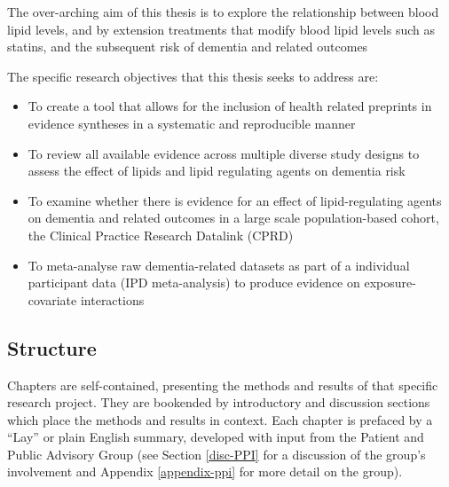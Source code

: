 \documentclass[a4paper, twoside]{templates/ociamthesis}
\providecommand{\tightlist}{%
  \setlength{\itemsep}{0pt}\setlength{\parskip}{0pt}}
\begin{document}
The over-arching aim of this thesis is to explore the relationship between blood lipid levels, and by extension treatments that modify blood lipid levels such as statins, and the subsequent risk of dementia and related outcomes

The specific research objectives that this thesis seeks to address are:

\begin{itemize}
\tightlist
\item
  To create a tool that allows for the inclusion of health related preprints in evidence syntheses in a systematic and reproducible manner
\item
  To review all available evidence across multiple diverse study designs to assess the effect of lipids and lipid regulating agents on dementia risk
\item
  To examine whether there is evidence for an effect of lipid-regulating agents on dementia and related outcomes in a large scale population-based cohort, the Clinical Practice Research Datalink (CPRD)
\item
  To meta-analyse raw dementia-related datasets as part of a individual participant data (IPD meta-analysis) to produce evidence on exposure-covariate interactions
\end{itemize}

\hypertarget{thesis-structure}{%
\subsection{Structure}\label{thesis-structure}}

Chapters are self-contained, presenting the methods and results of that specific research project. They are bookended by introductory and discussion sections which place the methods and results in context. Each chapter is prefaced by a ``Lay'' or plain English summary, developed with input from the Patient and Public Advisory Group (see Section \ref{disc-PPI} for a discussion of the group's involvement and Appendix \ref{appendix-ppi} for more detail on the group).
\end{document}
